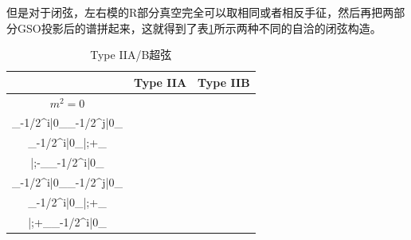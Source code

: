 但是对于闭弦，左右模的R部分真空完全可以取相同或者相反手征，然后再把两部分GSO投影后的谱拼起来，这就得到了表\ref{tab:2}所示两种不同的自洽的闭弦构造。
\begin{table}[htbp]
	\centering
	\begin{tabular}{c|cc}
		\hline
		 &Type IIA &Type IIB\\
		 \hline
		$m^2=0$ 
		&\(\displaystyle
			\begin{gathered}
				|\dot\alpha;-\rangle_{\mathrm{R}}\otimes|\alpha;+\rangle_{\mathrm{R}}\\\tilde{\psi}_{-1/2}^i|0\rangle_{\mathrm{NS}}\otimes \psi_{-1/2}^j|0\rangle_{\mathrm{NS}}\\\tilde{\psi}_{-1/2}^i|0\rangle_{\mathrm{NS}}\otimes|\alpha;+\rangle_{\mathrm{R}}\\|\dot\alpha;-\rangle_{\mathrm{R}}\otimes \psi_{-1/2}^i|0\rangle_{\mathrm{NS}}
			\end{gathered}
		\)
		&\(\displaystyle
		\begin{gathered}
			|\alpha;+\rangle_{\mathrm{R}}\otimes|\alpha;+\rangle_{\mathrm{R}}\\\tilde{\psi}_{-1/2}^i|0\rangle_{\mathrm{NS}}\otimes \psi_{-1/2}^j|0\rangle_{\mathrm{NS}}\\\tilde{\psi}_{-1/2}^i|0\rangle_{\mathrm{NS}}\otimes|\alpha;+\rangle_{\mathrm{R}}\\|\alpha;+\rangle_{\mathrm{R}}\otimes \psi_{-1/2}^i|0\rangle_{\mathrm{NS}}
		\end{gathered}
		\)\\
		\hline
	\end{tabular}
	\caption{Type IIA/B超弦}
	\label{tab:2}
\end{table}

